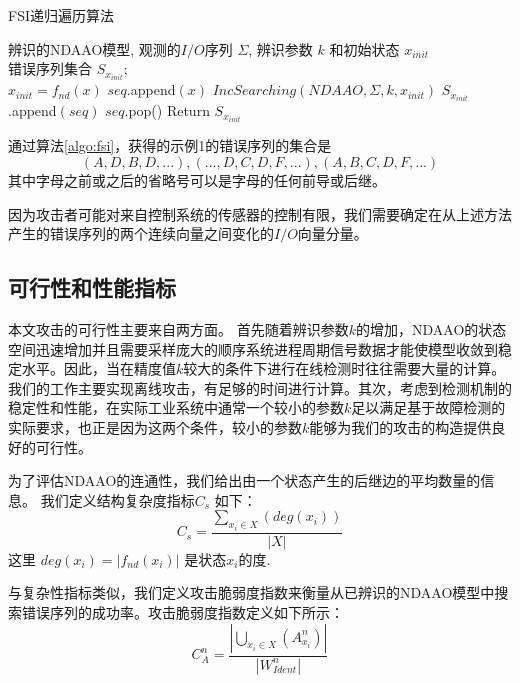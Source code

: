 \begin{algorithm}[h]
  \caption{FSI递归遍历算法}
  \label{algo:fsi}
  \begin{algorithmic}[1]
    \Require %
    辨识的NDAAO模型, 观测的$I/O$序列 $\varSigma$, 辨识参数 $k$ 和初始状态 $x_{init}$ \\  
    
    \Ensure %
    错误序列集合 $S_{x_{init}}$;  \\
      \State $x_{init}=f_{nd}(x)$
      \State $seq$.append$(x)$
      \State $IncSearching(NDAAO,\varSigma,k,x_{init})$
        \State $S_{x_{init}}$.append$(seq)$
      \EndIf
      \State $seq$.pop()
    \EndFor
    \State Return $S_{x_{init}}$
  \end{algorithmic}
\end{algorithm}

通过算法\ref{algo:fsi}，获得的示例1的错误序列的集合是\[{(A,D,B,D,...),(...,D,C,D,F,...),(A,B,C,D,F,...)}\]其中字母之前或之后的省略号可以是字母的任何前导或后继。

因为攻击者可能对来自控制系统的传感器的控制有限，我们需要确定在从上述方法产生的错误序列的两个连续向量之间变化的$I/O$向量分量。

\subsection{可行性和性能指标}

本文攻击的可行性主要来自两方面。 首先随着辨识参数$ k $的增加，NDAAO的状态空间迅速增加并且需要采样庞大的顺序系统进程周期信号数据才能使模型收敛到稳定水平\parencite{klein2005}。因此，当在精度值$ k $较大的条件下进行在线检测时往往需要大量的计算。 我们的工作主要实现离线攻击，有足够的时间进行计算。其次，考虑到检测机制的稳定性和性能，在实际工业系统中通常一个较小的参数$ k $足以满足基于故障检测的实际要求\parencite{roth2012}，也正是因为这两个条件，较小的参数$ k $能够为我们的攻击的构造提供良好的可行性。

为了评估NDAAO的连通性，我们给出由一个状态产生的后继边的平均数量的信息。 我们定义结构复杂度指标$ C_s $ 如下：
\begin{equation}
C_s= \dfrac{\sum_{x_i\in X} (deg(x_i))}{|X|} 
\end{equation} 这里 $deg(x_i)=|f_{nd}(x_i)|$ 是状态$x_i$的度.

与复杂性指标类似，我们定义攻击脆弱度指数来衡量从已辨识的NDAAO模型中搜索错误序列的成功率。攻击脆弱度指数定义如下所示：
\begin{equation}
 C_A^n=\dfrac{|\bigcup_{x_i \in X}(A_{x_i}^n)|}{|W_{Ident}^n|} 
 \end{equation}

